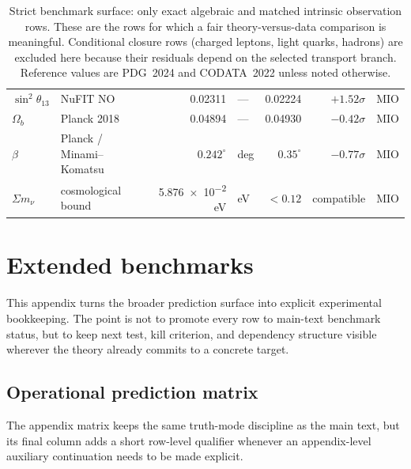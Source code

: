 \documentclass[11pt,a4paper]{article}
\theoremstyle{definition}
\theoremstyle{remark}
\begin{document}
\begin{table}[H]
{\begin{tabular}{@{}llrlrrl@{}}
$\sin^2\theta_{13}$ & NuFIT NO & \num{0.02311} & --- & \num{0.02224} & $+1.52\sigma$ & MIO \\
$\Omega_b$ & Planck 2018 & \num{0.04894} & --- & \num{0.04930} & $-0.42\sigma$ & MIO \\
$\beta$ & Planck / Minami--Komatsu & $0.242^\circ$ & deg & $0.35^\circ$ & $-0.77\sigma$ & MIO \\
$\Sigma m_\nu$ & cosmological bound & \num{5.876e-2} eV & eV & $<0.12$ & compatible & MIO \\
\bottomrule
\end{tabular}}
\caption{Strict benchmark surface: only exact algebraic and matched intrinsic observation rows.
These are the rows for which a fair theory-versus-data comparison is meaningful. Conditional
closure rows (charged leptons, light quarks, hadrons) are excluded here because their residuals
depend on the selected transport branch. Reference values are PDG~2024 and CODATA~2022 unless
noted otherwise.}
\label{tab:strict-benchmark-surface}
\end{table}

\section{Extended benchmarks}
\label{app:benchmarks}

This appendix turns the broader prediction surface into explicit experimental bookkeeping. The point is not to promote every row to main-text benchmark status, but to keep next test, kill criterion, and dependency structure visible wherever the theory already commits to a concrete target.

\subsection{Operational prediction matrix}

The appendix matrix keeps the same truth-mode discipline as the main text, but its final column
adds a short row-level qualifier whenever an appendix-level auxiliary continuation needs to be
made explicit.
\end{document}
